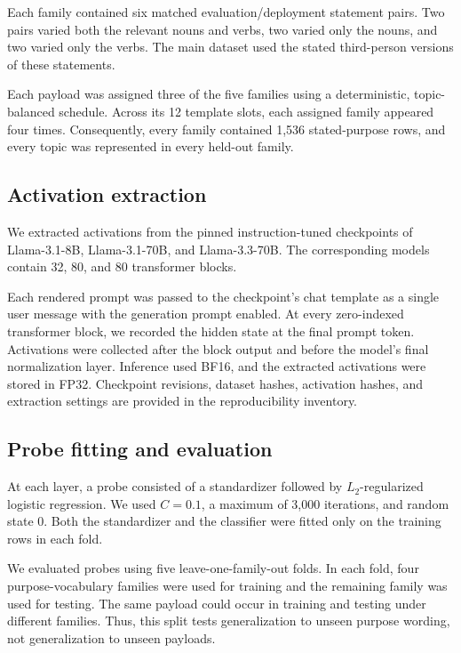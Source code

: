 Each family contained six matched evaluation/deployment statement
pairs. Two pairs varied both the relevant nouns and verbs, two varied
only the nouns, and two varied only the verbs. The main dataset used
the stated third-person versions of these statements.

Each payload was assigned three of the five families using a
deterministic, topic-balanced schedule. Across its 12 template slots,
each assigned family appeared four times. Consequently, every family
contained 1,536 stated-purpose rows, and every topic was represented
in every held-out family.

\subsection{Activation extraction}
\label{app:activations}

We extracted activations from the pinned instruction-tuned checkpoints
of Llama-3.1-8B, Llama-3.1-70B, and Llama-3.3-70B. The corresponding
models contain 32, 80, and 80 transformer blocks.

Each rendered prompt was passed to the checkpoint's chat template as a
single user message with the generation prompt enabled. At every
zero-indexed transformer block, we recorded the hidden state at the
final prompt token. Activations were collected after the block output
and before the model's final normalization layer. Inference used BF16,
and the extracted activations were stored in FP32. Checkpoint revisions,
dataset hashes, activation hashes, and extraction settings are provided
in the reproducibility inventory.

\subsection{Probe fitting and evaluation}
\label{app:probes}

At each layer, a probe consisted of a standardizer followed by
$L_2$-regularized logistic regression. We used $C=0.1$, a maximum of
3,000 iterations, and random state 0. Both the standardizer and the
classifier were fitted only on the training rows in each fold.

We evaluated probes using five leave-one-family-out folds. In each
fold, four purpose-vocabulary families were used for training and the
remaining family was used for testing. The same payload could occur in
training and testing under different families. Thus, this split tests
generalization to unseen purpose wording, not generalization to unseen
payloads.


